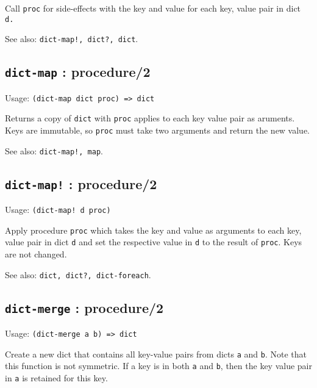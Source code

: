 \documentclass[
]{article}
\newcommand{\passthrough}[1]{#1}
\begin{document}
Call \passthrough{\lstinline!proc!} for side-effects with the key and
value for each key, value pair in dict \passthrough{\lstinline!d.!}

See also: \passthrough{\lstinline"dict-map!, dict?, dict"}.

\hypertarget{dict-map-procedure2-2}{%
\subsection{\texorpdfstring{\texttt{dict-map} :
procedure/2}{dict-map : procedure/2}}\label{dict-map-procedure2-2}}

Usage: \passthrough{\lstinline!(dict-map dict proc) => dict!}

Returns a copy of \passthrough{\lstinline!dict!} with
\passthrough{\lstinline!proc!} applies to each key value pair as
aruments. Keys are immutable, so \passthrough{\lstinline!proc!} must
take two arguments and return the new value.

See also: \passthrough{\lstinline"dict-map!, map"}.

\hypertarget{dict-map-procedure2-3}{%
\subsection{\texorpdfstring{\texttt{dict-map!} :
procedure/2}{dict-map! : procedure/2}}\label{dict-map-procedure2-3}}

Usage: \passthrough{\lstinline"(dict-map! d proc)"}

Apply procedure \passthrough{\lstinline!proc!} which takes the key and
value as arguments to each key, value pair in dict
\passthrough{\lstinline!d!} and set the respective value in
\passthrough{\lstinline!d!} to the result of
\passthrough{\lstinline!proc!}. Keys are not changed.

See also: \passthrough{\lstinline!dict, dict?, dict-foreach!}.

\hypertarget{dict-merge-procedure2-1}{%
\subsection{\texorpdfstring{\texttt{dict-merge} :
procedure/2}{dict-merge : procedure/2}}\label{dict-merge-procedure2-1}}

Usage: \passthrough{\lstinline!(dict-merge a b) => dict!}

Create a new dict that contains all key-value pairs from dicts
\passthrough{\lstinline!a!} and \passthrough{\lstinline!b!}. Note that
this function is not symmetric. If a key is in both
\passthrough{\lstinline!a!} and \passthrough{\lstinline!b!}, then the
key value pair in \passthrough{\lstinline!a!} is retained for this key.
\end{document}
